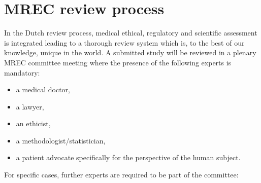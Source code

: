 \documentclass[authordate, meta]{jote-new-article}
\begin{document}
\section{MREC review process}



In the Dutch review process, medical ethical, regulatory and scientific assessment is integrated leading to a thorough review system which is, to the best of our knowledge, unique in the world. A submitted study will be reviewed in a plenary MREC committee meeting where the presence of the following experts is mandatory:

\begin{itemize}
  \item a medical doctor,



  \item a lawyer,



  \item an ethicist,



  \item a methodologist/statistician,



  \item a patient advocate specifically for the perspective of the human subject.


\end{itemize}

For specific cases, further experts are required to be part of the committee:
\end{document}
